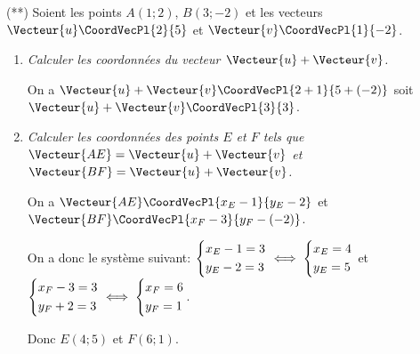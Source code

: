 \documentclass[a4paper]{article}
\begin{document}
\begin{exercice}{(**)}{}
  Soient les points $A(1;2)$, $B(3;-2)$ et les vecteurs $\Vecteur{u}\CoordVecPl{2}{5}$ et $\Vecteur{v}\CoordVecPl{1}{-2}$.

  \begin{enumerate}
    \item \textit{Calculer les coordonnées du vecteur $\Vecteur{u}+\Vecteur{v}$.}
    
    On a $\Vecteur{u}+\Vecteur{v}\CoordVecPl{2+1}{5+(-2)}$ soit $\Vecteur{u}+\Vecteur{v}\CoordVecPl{3}{3}$.

    \item \textit{Calculer les coordonnées des points $E$ et $F$ tels que $\Vecteur{AE}=\Vecteur{u}+\Vecteur{v}$ et $\Vecteur{BF}=\Vecteur{u}+\Vecteur{v}$.}

    On a $\Vecteur{AE}\CoordVecPl{x_E-1}{y_E-2}$ et $\Vecteur{BF}\CoordVecPl{x_F-3}{y_F-(-2)}$.

    On a donc le système suivant:
    $\begin{dcases}
      x_E-1=3\\
      y_E-2=3
    \end{dcases} \iff \begin{dcases}
      x_E=4\\
      y_E=5
    \end{dcases}$ et $\begin{dcases}
      x_F-3=3\\
      y_F+2=3
    \end{dcases} \iff \begin{dcases}
      x_F=6\\
      y_F=1
    \end{dcases}$.

    Donc $E(4;5)$ et $F(6;1)$.
  \end{enumerate}
\end{exercice}
\end{document}
